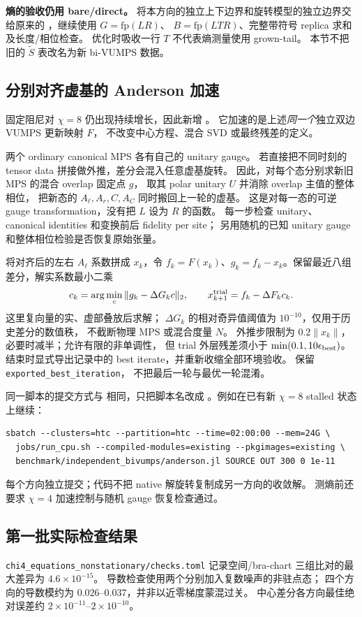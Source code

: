 \textbf{熵的验收仍用 bare/direct。}
将本方向的独立上下边界和旋转模型的独立边界交给原来的
，继续使用 $G=\mathrm{fp}(LR)$、
$B=\mathrm{fp}(LTR)$、完整带符号 replica 求和及长度/相位检查。
优化时吸收一行 $T$ 不代表熵测量使用 grown-tail。
本节不把旧的 $\widetilde S$ 表改名为新 bi-VUMPS 数据。

\subsection{分别对齐虚基的 Anderson 加速}
固定阻尼对 $\chi=8$ 仍出现持续增长，因此新增
。
它加速的是上述\emph{同一个}独立双边 VUMPS 更新映射 $F$，
不改变中心方程、混合 SVD 或最终残差的定义。

两个 ordinary canonical MPS 各有自己的 unitary gauge。
若直接把不同时刻的 tensor data 拼接做外推，差分会混入任意虚基旋转。
因此，对每个态分别求新旧 MPS 的混合 overlap 固定点 $g$，
取其 polar unitary $U$ 并消除 overlap 主值的整体相位，
把新态的 $A_\ell,A_r,C,A_C$ 同时搬回上一轮的虚基。
这是对每一态的可逆 gauge transformation，没有把 $L$ 设为 $R$ 的函数。
每一步检查 unitary、canonical identities 和变换前后 fidelity per site；
另用随机的已知 unitary gauge 和整体相位检验是否恢复原始张量。

将对齐后的左右 $A_\ell$ 系数拼成 $x_k$，令
$f_k=F(x_k)$、$g_k=f_k-x_k$。保留最近八组差分，解实系数最小二乘
\[
 c_k=\arg\min_c\|g_k-\Delta G_kc\|_2,
 \qquad x_{k+1}^{\rm trial}=f_k-\Delta F_kc_k.
\]
这里复向量的实、虚部叠放后求解；
$\Delta G_k$ 的相对奇异值阈值为 $10^{-10}$，仅用于历史差分的数值秩，
不截断物理 MPS 或混合度量 $N$。
外推步限制为 $0.2\|x_k\|$，必要时减半；允许有限的非单调性，
但 trial 外层残差须小于 $\min(0.1,10\epsilon_{\rm best})$。
结束时显式导出记录中的 best iterate，并重新收缩全部环境验收。
 保留 \texttt{exported\_best\_iteration}，
不把最后一轮与最优一轮混淆。

同一脚本的提交方式与  相同，只把脚本名改成
。例如在已有新 $\chi=8$ stalled 状态上继续：
\begin{verbatim}
sbatch --clusters=htc --partition=htc --time=02:00:00 --mem=24G \
  jobs/run_cpu.sh --compiled-modules=existing --pkgimages=existing \
  benchmark/independent_bivumps/anderson.jl SOURCE OUT 300 0 1e-11
\end{verbatim}
每个方向独立提交；代码不把 native 解旋转复制成另一方向的收敛解。
测熵前还要求 $\chi=4$ 加速控制与随机 gauge 恢复检查通过。

\subsection{第一批实际检查结果}
\texttt{chi4\_equations\_nonstationary/checks.toml} 记录空间/bra-chart
三组比对的最大差异为 $4.6\times10^{-15}$。
导数检查使用两个分别加入复数噪声的非驻点态；
四个方向的导数模约为 $0.026$--$0.037$，并非以近零梯度蒙混过关。
中心差分各方向最佳绝对误差约 $2\times10^{-11}$--$2\times10^{-10}$。


